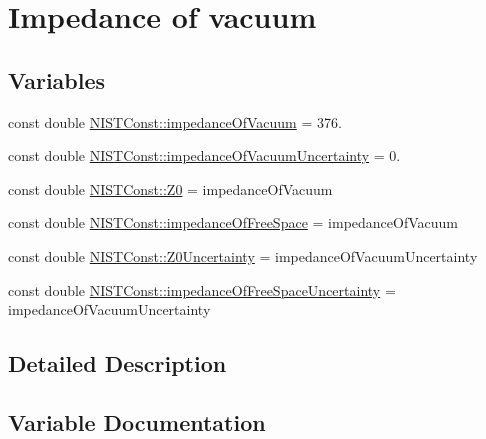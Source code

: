 \hypertarget{group___n_i_s_t_const-_impedance_of_vacuum}{}\section{Impedance of vacuum}
\label{group___n_i_s_t_const-_impedance_of_vacuum}
\subsection*{Variables}
\begin{DoxyCompactItemize}
\item 
const double \hyperlink{group___n_i_s_t_const-_impedance_of_vacuum_ga51e1aede5d89041ea7423522b526dd0e}{N\+I\+S\+T\+Const\+::impedance\+Of\+Vacuum} = 376.
\item 
const double \hyperlink{group___n_i_s_t_const-_impedance_of_vacuum_ga0d686b0016dc8c1f0bda161283b4f9c5}{N\+I\+S\+T\+Const\+::impedance\+Of\+Vacuum\+Uncertainty} = 0.
\item 
const double \hyperlink{group___n_i_s_t_const-_impedance_of_vacuum_ga0de5c47b3a38d72c61aac5574ea154ca}{N\+I\+S\+T\+Const\+::\+Z0} = impedance\+Of\+Vacuum
\item 
const double \hyperlink{group___n_i_s_t_const-_impedance_of_vacuum_ga299cd5a5d3a7df43dd6b8c8335bbc8c6}{N\+I\+S\+T\+Const\+::impedance\+Of\+Free\+Space} = impedance\+Of\+Vacuum
\item 
const double \hyperlink{group___n_i_s_t_const-_impedance_of_vacuum_gaa511043a811bd20587a1903b52aa6dc7}{N\+I\+S\+T\+Const\+::\+Z0\+Uncertainty} = impedance\+Of\+Vacuum\+Uncertainty
\item 
const double \hyperlink{group___n_i_s_t_const-_impedance_of_vacuum_ga16b669e68f98b1314ca4df5973203147}{N\+I\+S\+T\+Const\+::impedance\+Of\+Free\+Space\+Uncertainty} = impedance\+Of\+Vacuum\+Uncertainty
\end{DoxyCompactItemize}


\subsection{Detailed Description}


\subsection{Variable Documentation}
\mbox{\label{group___n_i_s_t_const-_impedance_of_vacuum_ga299cd5a5d3a7df43dd6b8c8335bbc8c6}} 
